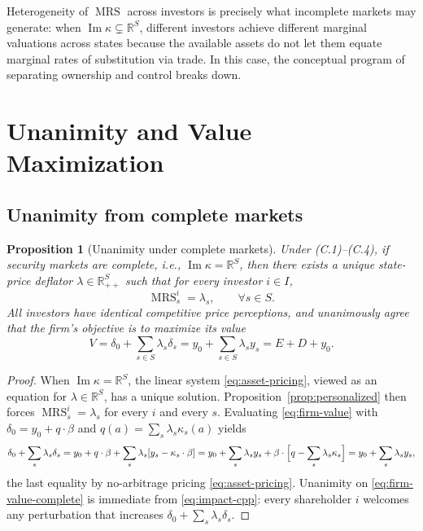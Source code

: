 \documentclass[11pt,a4paper,oneside]{book}
\def\R{\mathbb{R}}
\DeclareMathOperator{\MRS}{MRS}
\DeclareMathOperator{\Range}{Im}
\theoremstyle{plain}
\newtheorem{proposition}[theorem]{Proposition}
\theoremstyle{definition}
\theoremstyle{remark}
\numberwithin{equation}{chapter}
\begin{document}
Heterogeneity of $\MRS$ across investors is precisely what incomplete markets may generate: when $\Range \kappa \subsetneq \R^S$, different investors achieve different marginal valuations across states because the available assets do not let them equate marginal rates of substitution via trade.
In this case, the conceptual program of separating ownership and control breaks down.

\section{Unanimity and Value Maximization}
\label{sec:unanimity}

\subsection{Unanimity from complete markets}

\begin{proposition}[Unanimity under complete markets]\label{prop:unanimity-complete}
Under \textup{(C.1)--(C.4)}, if security markets are complete, i.e., $\Range \kappa = \R^S$, then there exists a unique state-price deflator $\lambda \in \R^S_{++}$ such that for every investor $i \in I$,
\begin{equation*}
  \MRS^i_s = \lambda_s, \qquad \forall s \in S.
\end{equation*}
All investors have identical competitive price perceptions, and unanimously agree that the firm's objective is to maximize its value
\begin{equation}\label{eq:firm-value-complete}
  V = \delta_0 + \sum_{s \in S} \lambda_s \delta_s
    = y_0 + \sum_{s \in S} \lambda_s y_s
    = E + D + y_0.
\end{equation}
\end{proposition}

\begin{proof}
When $\Range \kappa = \R^S$, the linear system \eqref{eq:asset-pricing}, viewed as an equation for $\lambda \in \R^S$, has a unique solution.
Proposition~\ref{prop:personalized} then forces $\MRS^i_s = \lambda_s$ for every $i$ and every $s$.
Evaluating \eqref{eq:firm-value} with $\delta_0 = y_0 + q \cdot \beta$ and $q(a) = \sum_s \lambda_s \kappa_s(a)$ yields
\begin{equation*}
  \delta_0 + \sum_s \lambda_s \delta_s
  = y_0 + q \cdot \beta + \sum_s \lambda_s [y_s - \kappa_s \cdot \beta]
  = y_0 + \sum_s \lambda_s y_s + \beta \cdot \Bigl[ q - \sum_s \lambda_s \kappa_s \Bigr]
  = y_0 + \sum_s \lambda_s y_s,
\end{equation*}
the last equality by no-arbitrage pricing \eqref{eq:asset-pricing}.
Unanimity on \eqref{eq:firm-value-complete} is immediate from \eqref{eq:impact-cpp}: every shareholder $i$ welcomes any perturbation that increases $\delta_0 + \sum_s \lambda_s \delta_s$.
\end{proof}
\end{document}
